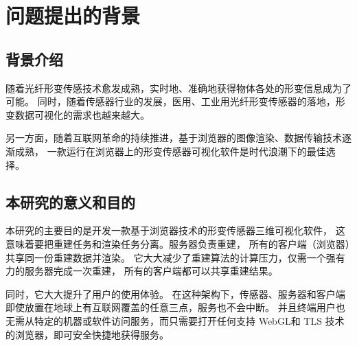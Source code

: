 \section{问题提出的背景}
\subsection{背景介绍}

随着光纤形变传感技术愈发成熟，实时地、准确地获得物体各处的形变信息成为了可能。
同时，随着传感器行业的发展，医用、工业用光纤形变传感器的落地，形变数据可视化的需求也越来越大。

另一方面，随着互联网革命的持续推进，基于浏览器的图像渲染、数据传输技术逐渐成熟，
一款运行在浏览器上的形变传感器可视化软件是时代浪潮下的最佳选择。

\subsection{本研究的意义和目的}

本研究的主要目的是开发一款基于浏览器技术的形变传感器三维可视化软件，
这意味着要把重建任务和渲染任务分离。服务器负责重建，
所有的客户端（浏览器）共享同一份重建数据并渲染。
它大大减少了重建算法的计算压力，仅需一个强有力的服务器完成一次重建，
所有的客户端都可以共享重建结果。

同时，它大大提升了用户的使用体验。
在这种架构下，传感器、服务器和客户端即使放置在地球上有互联网覆盖的任意三点，服务也不会中断。
并且终端用户也无需从特定的机器或软件访问服务，而只需要打开任何支持 WebGL和 TLS 技术的浏览器，即可安全快捷地获得服务。